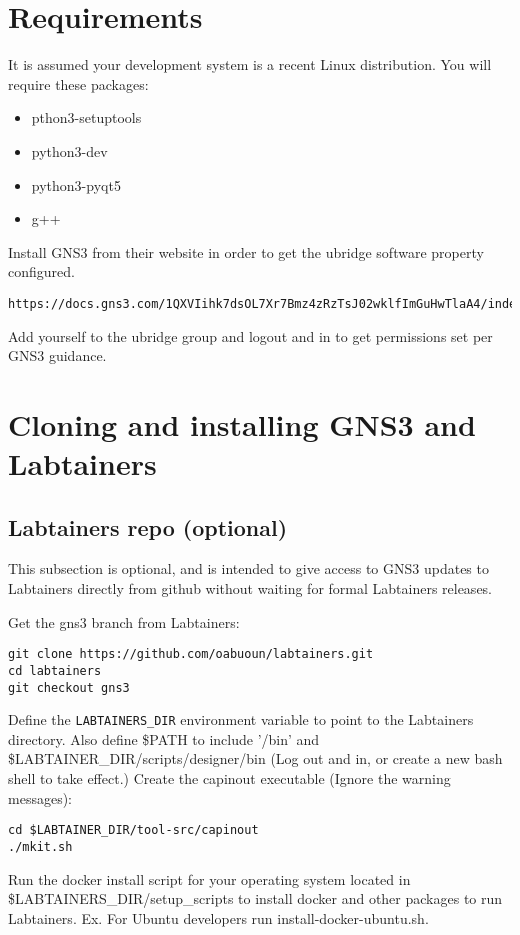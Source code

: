 \documentclass[12pt]{article}
\begin{document}
\section {Requirements}
It is assumed your development system is a recent Linux distribution.  You will require these packages:
\begin{itemize}
	\item pthon3-setuptools
	\item python3-dev
	\item python3-pyqt5
	\item g++
\end{itemize}
\noindent Install GNS3 from their website in order to get the ubridge software property configured.
\begin{verbatim}
https://docs.gns3.com/1QXVIihk7dsOL7Xr7Bmz4zRzTsJ02wklfImGuHwTlaA4/index.html
\end{verbatim}
Add yourself to the ubridge group and logout and in to get permissions set per GNS3 guidance.

\section{Cloning and installing GNS3 and Labtainers}
\subsection{Labtainers repo (optional)}
This subsection is optional, and is intended to give access to GNS3 updates to Labtainers directly
from github without waiting for formal Labtainers releases.  

Get the gns3 branch from Labtainers:
\begin{verbatim}
git clone https://github.com/oabuoun/labtainers.git
cd labtainers
git checkout gns3 
\end{verbatim}
\noindent Define the {\tt LABTAINERS\_DIR} environment variable to point to the Labtainers directory. Also define \$PATH to include '/bin' and \$LABTAINER\_DIR/scripts/designer/bin
(Log out and in, or create a new bash shell to take effect.)
Create the capinout executable (Ignore the warning messages):
\begin{verbatim}
cd $LABTAINER_DIR/tool-src/capinout
./mkit.sh
\end{verbatim}
\noindent Run the docker install script for your operating system located in \$LABTAINERS\_DIR/setup\_scripts to install docker and other packages to run Labtainers. Ex. For Ubuntu developers run install-docker-ubuntu.sh.
\end{document}
